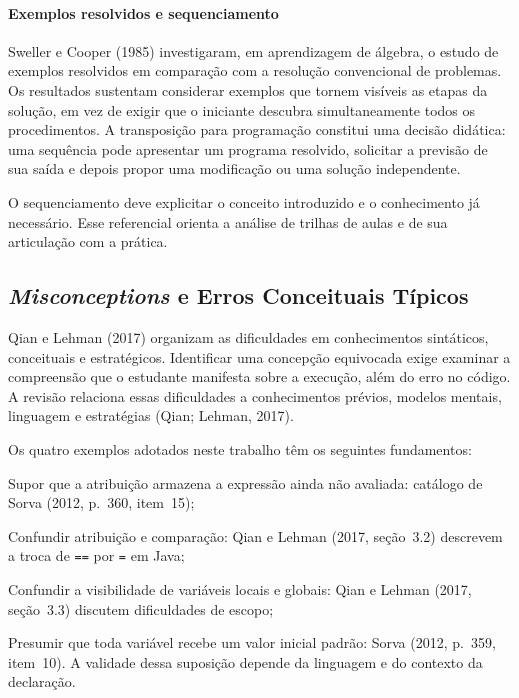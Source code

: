 \documentclass[
    12pt
    ,oneside
    ,a4paper
    ,chapter=TITLE
    ,section=TITLE
    ,sumario=abnt-6027-2012]{abntex2}
\newcommand{\citeQian}{(Qian; Lehman, 2017)}
\begin{document}
\paragraph*{Exemplos resolvidos e sequenciamento}
Sweller e Cooper (1985) investigaram, em aprendizagem de álgebra, o estudo de
exemplos resolvidos em comparação com a resolução convencional de problemas.
Os resultados sustentam considerar exemplos que tornem visíveis as etapas da
solução, em vez de exigir que o iniciante descubra simultaneamente todos os
procedimentos. A transposição para programação constitui uma decisão didática:
uma sequência pode apresentar um programa resolvido, solicitar a previsão de sua
saída e depois propor uma modificação ou uma solução independente.

O sequenciamento deve explicitar o conceito introduzido e o conhecimento já
necessário.  Esse referencial orienta a análise de
trilhas de aulas e de sua articulação com a prática.

\subsection{\textit{Misconceptions} e Erros Conceituais Típicos}

Qian e Lehman (2017) organizam as dificuldades em conhecimentos sintáticos,
conceituais e estratégicos. Identificar uma concepção equivocada exige examinar a compreensão que o estudante manifesta sobre a execução, além do erro no código. A revisão relaciona essas dificuldades a conhecimentos prévios,
modelos mentais, linguagem e estratégias \citeQian.

Os quatro exemplos adotados neste trabalho têm os seguintes fundamentos:
\begin{alineas}
    \item Supor que a atribuição armazena a expressão ainda não avaliada: catálogo de Sorva (2012, p.~360, item~15);
    \item Confundir atribuição e comparação: Qian e Lehman (2017, seção~3.2) descrevem a troca de \texttt{==} por \texttt{=} em Java;
    \item Confundir a visibilidade de variáveis locais e globais: Qian e Lehman (2017, seção~3.3) discutem dificuldades de escopo;
    \item Presumir que toda variável recebe um valor inicial padrão: Sorva (2012, p.~359, item~10). A validade dessa suposição depende da linguagem e do contexto da declaração.
\end{alineas}
\end{document}
